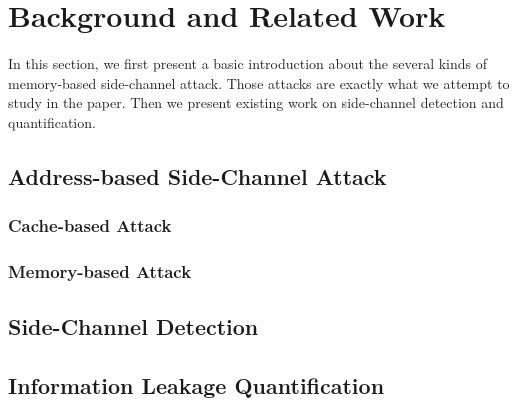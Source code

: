 \section{Background and Related Work}
In this section, we first present a basic introduction about the several kinds of memory-based side-channel attack.
Those attacks are exactly what we attempt to study in the paper. Then we present existing work on side-channel 
detection and quantification.  
\subsection{Address-based Side-Channel Attack}
\subsubsection{Cache-based Attack}
\subsubsection{Memory-based Attack}

\subsection{Side-Channel Detection}

\subsection{Information Leakage Quantification}